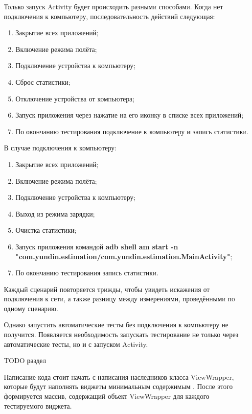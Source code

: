 \documentclass[a4paper,14pt]{extarticle} %
\begin{document}
	Только запуск Activity будет происходить разными способами. Когда нет подключения к компьютеру, последовательность действий следующая:
	\begin{enumerate}
		\item Закрытие всех приложений;
		\item Включение режима полёта;
		\item Подключение устройства к компьютеру;
		\item Сброс статистики;
		\item Отключение устройства от компьютера;
		\item Запуск приложения через нажатие на его иконку в списке всех приложений;
		\item По окончанию тестирования подключение к компьютеру и запись статистики.
	\end{enumerate}

	В случае подключения к компьютеру:
	\begin{enumerate}
		\item Закрытие всех приложений;
		\item Включение режима полёта;
		\item Подключение устройства к компьютеру;
		\item Выход из режима зарядки;
		\item Очистка статистики;
		\item Запуск приложения командой \textbf{adb shell am start -n "com.yundin.estimation/com.yundin.estimation.MainActivity"};
		\item По окончанию тестирования запись статистики.
	\end{enumerate}

	Каждый сценарий повторяется трижды, чтобы увидеть искажения от подключения к сети, а также разницу между измерениями, проведёнными по одному сценарию.
	
	Однако запустить автоматические тесты без подключения к компьютеру не получится. Появляется необходимость запускать тестирование не только через автоматические тесты, но и с запуском Activity.
	
	{\huge TODO раздел}
	
	Написание кода стоит начать с написания наследников класса ViewWrapper, которые будут наполнять виджеты минимальным содержимым \ris{\ref{fig:wrapper}}. После этого формируется массив, содержащий объект ViewWrapper для каждого тестируемого виджета.
	
\end{document}
